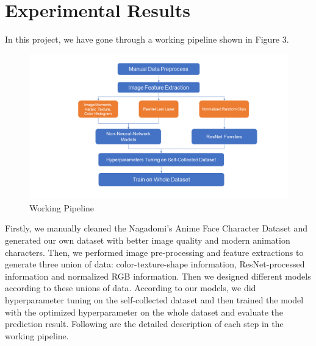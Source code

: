 \documentclass[11.5pt]{article}
\begin{document}
    \section{Experimental Results}
    In this project, we have gone through a working pipeline shown in Figure 3.
    \begin{figure}[h!]
        \centering
        \includegraphics[width=0.8\linewidth]{images/working_pipeline.png}
        \caption{Working Pipeline}
    \end{figure}
    Firstly, we manually cleaned the Nagadomi's Anime Face Character Dataset and generated our own dataset with better image quality and modern animation characters.
    Then, we performed image pre-processing and feature extractions to generate three union of data: color-texture-shape information, ResNet-processed information and normalized RGB information.
    Then we designed different models according to these unions of data.
    According to our models, we did hyperparameter tuning on the self-collected dataset and then trained the model with the optimized hyperparameter on the whole dataset and evaluate the prediction result.
    Following are the detailed description of each step in the working pipeline.
\end{document}
